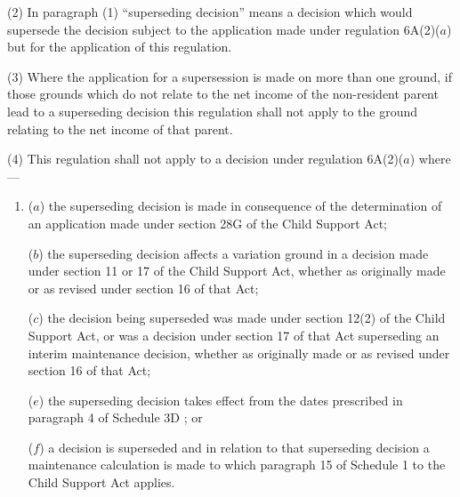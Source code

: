 \documentclass[12pt,a4paper]{article}
\begin{document}
(2) In paragraph (1) “superseding decision” means a decision which would supersede the decision subject to the application made under regulation %
6A(2)($a$)  %
but for the application of this regulation.


(3) Where the application for a supersession is made on more than one ground, if those grounds which do not relate to the net income of the non-resident parent lead to a superseding decision this regulation shall not apply to the ground relating to the net income of that parent.

(4) This regulation shall not apply to a decision under regulation %
6A(2)($a$)  %
where—
\begin{enumerate}\item[]
($a$) the superseding decision is made in consequence of the determination of an application made under section 28G of the Child Support Act;

($b$) the superseding decision affects a variation ground in a decision made under section 11 or 17 of the Child Support Act, whether as originally made or as revised under section 16 of that Act;

($c$) the decision being superseded was made under section 12(2) of the Child Support Act, or was a decision under section 17 of that Act superseding an interim maintenance decision, whether as originally made or as revised under section 16 of that Act;
%

($e$) the superseding decision takes effect from the dates prescribed in 
paragraph 4 of Schedule 3D%
% 
; or

($f$) a decision is superseded and in relation to that superseding decision a maintenance calculation is made to which paragraph 15 of Schedule 1 to the Child Support Act applies.
\end{enumerate}
\end{document}
